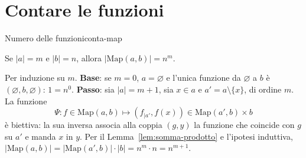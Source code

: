 \section{Contare le funzioni}\label{sec:contare-funzioni}


\begin{concetto}
\begin{Teorema}{Numero delle funzioni}{conta-map}
    \begin{prerequisiti}
    \end{prerequisiti}
    Se $|a| = m$ e $|b| = n$, allora $|\mathrm{Map}(a, b)| = n^m$.
\end{Teorema}
\begin{dimostrazione}
    Per induzione su $m$. \textbf{Base}: se $m = 0$, $a = \varnothing$ e l'unica funzione da $\varnothing$ a $b$ è $(\varnothing, b, \varnothing)$: $1 = n^0$.
    \textbf{Passo}: sia $|a| = m + 1$, sia $x \in a$ e $a' = a \setminus \{x\}$, di ordine $m$. La funzione
    \[ \Psi \colon f \in \mathrm{Map}(a, b) \mapsto (f_{|a'}, f(x)) \in \mathrm{Map}(a', b) \times b \]
    è biettiva: la sua inversa associa alla coppia $(g, y)$ la funzione che coincide con $g$ su $a'$ e manda $x$ in $y$. Per il
    Lemma~\ref{lem:somma-prodotto} e l'ipotesi induttiva, $|\mathrm{Map}(a, b)| = |\mathrm{Map}(a', b)| \cdot |b| = n^m \cdot n = n^{m + 1}$.
\end{dimostrazione}
\end{concetto}

